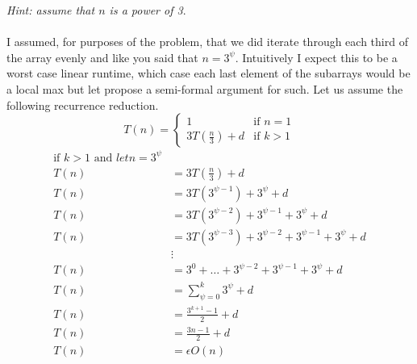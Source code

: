 \documentclass[paper=a4,fontsize=11pt]{article}
\begin{document}
\begin{enumerate}
\textit{Hint: assume that $n$ is a power of 3}.\\\\
I assumed, for purposes of the problem, that we did iterate through each third of the array evenly and like you said that $n = 3^\psi$. Intuitively I expect this to be a worst case linear runtime, which case each last element of the subarrays would be a local max but let propose a semi-formal argument for such. Let us assume the following recurrence reduction.
\[
  T(n) =
    \begin{cases}
        1 & \text{if $n = 1$} \\
        3T(\frac{n}{3}) + d & \text{if $k > 1$}
    \end{cases}
\]
\begin{align*}
\text{if $k > 1$ and $let n = 3^\psi$}\\
T(n) &= 3T(\frac{n}{3}) + d\\
T(n) &= 3T(3^{\psi - 1}) + 3^{\psi} + d\\
T(n) &= 3T(3^{\psi - 2}) + 3^{\psi - 1} + 3^{\psi} + d\\
T(n) &= 3T(3^{\psi - 3}) + 3^{\psi - 2} + 3^{\psi - 1} + 3^{\psi}  + d\\
&\vdots\\
T(n) &= 3^{0} + \dots + 3^{\psi - 2} + 3^{\psi - 1} + 3^{\psi}  + d\\
T(n) &= \sum_{\psi=0}^{k}3^{\psi} + d\\
T(n) &= \frac{3^{k+1} - 1}{2} + d\\
T(n) &= \frac{3n - 1}{2} + d\\
T(n) &= \epsilon O(n)\\
\end{align*}\\
\end{enumerate}
\end{document}
